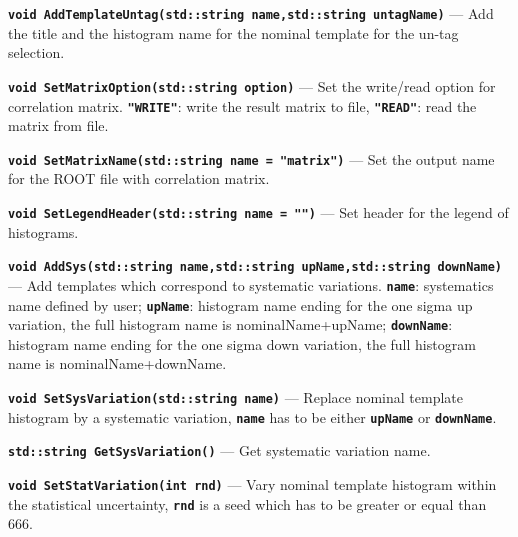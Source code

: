 \documentclass[12pt]{article}
\newcommand\verbbf[1]{\textcolor[rgb]{0,0,1}{\texttt{\textbf{#1}}}}
\newcommand\verbbfb[1]{\textcolor[rgb]{0,0,0}{\texttt{\textbf{#1}}}}
\begin{document}
\vspace{0.3cm}

\noindent \verbbf{void AddTemplateUntag(std::string name,std::string untagName)} ---
Add the title and the histogram name for the nominal template for the
un-tag selection.

\vspace{0.3cm}

\noindent \verbbf{void SetMatrixOption(std::string option)} ---
Set the write/read option for correlation matrix. \verbbf{"WRITE"}:
write the result matrix to file, \verbbf{"READ"}: read the matrix from
file.

\vspace{0.3cm}

\noindent \verbbf{void SetMatrixName(std::string name = "matrix")} ---
Set the output name for the ROOT file with correlation matrix.

\vspace{0.3cm}

\noindent \verbbf{void SetLegendHeader(std::string name = "")} ---
Set header for the legend of histograms.

\vspace{0.3cm}

\noindent \verbbf{void AddSys(std::string name,std::string upName,std::string downName)} ---
Add templates which correspond to systematic variations.
\verbbfb{name}: systematics name defined by user;
\verbbfb{upName}: histogram name ending for the one sigma up variation, the full
histogram name is nominalName+upName;
\verbbfb{downName}: histogram name ending for
the one sigma down variation, the full histogram name is
nominalName+downName.

\vspace{0.3cm} 

\noindent \verbbf{void SetSysVariation(std::string name)} --- Replace
nominal template histogram by a systematic variation, \verbbfb{name}
has to be either \verbbfb{upName} or \verbbfb{downName}.

\vspace{0.3cm}

\noindent \verbbf{std::string GetSysVariation()} ---
Get systematic variation name.

\vspace{0.3cm}

\noindent \verbbf{void SetStatVariation(int rnd)} ---
Vary nominal template histogram within the statistical uncertainty,
\verbbfb{rnd} is a seed which has to be greater or equal than 666.
\end{document}
